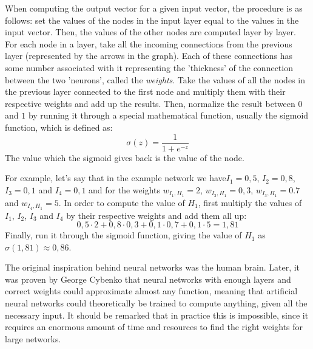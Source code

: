 \documentclass[12pt, titlepage]{article}
\begin{document}
		When computing the output vector for a given input vector, the procedure is as follows: set the values of the nodes in the input layer equal to the values in the input vector. Then, the values of the other nodes are computed layer by layer. For each node in a layer, take all the incoming connections from the previous layer (represented by the arrows in the graph). Each of these connections has some number associated with it representing the 'thickness' of the connection between the two 'neurons', called the \textit{weights}. Take the values of all the nodes in the previous layer connected to the first node and multiply them with their respective weights and add up the results. Then, normalize the result between $0$ and $1$ by running it through a special mathematical function, usually the sigmoid function, which is defined as:
		\begin{equation*}
		\sigma(z) = \frac1{1+e^{-z}}
		\end{equation*}
		The value which the sigmoid gives back is the value of the node.
		
		For example, let's say that in the example network we have$I_1=0,5$, $I_2=0,8$, $I_3=0,1$ and $I_4=0,1$  and for the weights $w_{I_1,H_1}=2$, $w_{I_2,H_1}=0,3$, $w_{I_3,H_1}=0.7$ and $w_{I_4,H_1}=5$. In order to compute the value of $H_1$, first multiply the values of $I_1$, $I_2$, $I_3$ and $I_4$ by their respective weights and add them all up:
		\begin{equation*}
		0,5\cdot 2 + 0,8\cdot 0,3 + 0,1\cdot 0,7 + 0,1\cdot 5 = 1,81
		\end{equation*}
		Finally, run it through the sigmoid function, giving the value of $H_1$ as $\sigma(1,81)\approx 0,86$.
		
		The original inspiration behind neural networks was the human brain. Later, it was proven by George Cybenko \cite{cybenko} that neural networks with enough layers and correct weights could approximate almost any function, meaning that artificial neural networks could theoretically be trained to compute anything, given all the necessary input. It should be remarked that in practice this is impossible, since it requires an enormous amount of time and resources to find the right weights for large networks.
		
\end{document}
